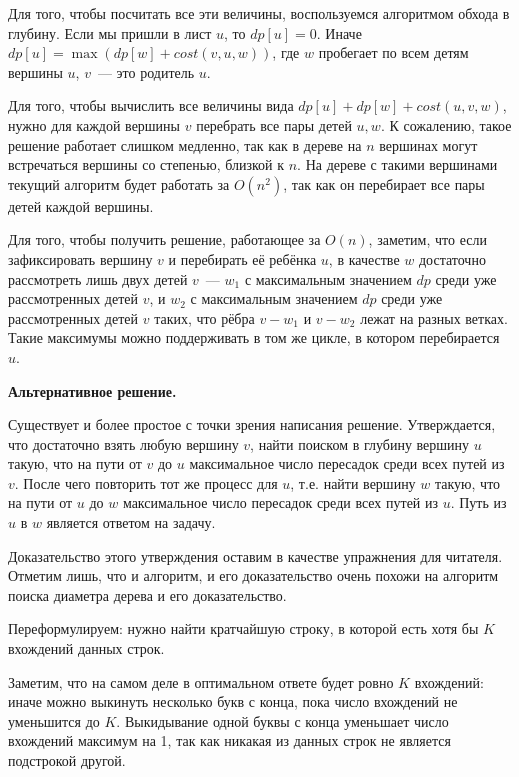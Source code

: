 \documentclass[12pt]{article}
\theoremstyle{definition}
\begin{document}
Для того, чтобы посчитать все эти величины, воспользуемся алгоритмом обхода в глубину. Если мы пришли в лист $u$, то $dp[u]=0$. Иначе $dp[u]=\max(dp[w]+cost(v,u,w))$, где $w$ пробегает по всем детям вершины $u$, $v$~--- это родитель $u$.

Для того, чтобы вычислить все величины вида $dp[u]+dp[w]+cost(u,v,w)$, нужно для каждой вершины $v$ перебрать все пары детей $u,w$. К сожалению, такое решение работает слишком медленно, так как в дереве на $n$ вершинах могут встречаться вершины со степенью, близкой к $n$. На дереве с такими вершинами текущий алгоритм будет работать за $O(n^2)$, так как он перебирает все пары детей каждой вершины.

Для того, чтобы получить решение, работающее за $O(n)$, заметим, что если зафиксировать вершину $v$ и перебирать её ребёнка $u$, в качестве $w$ достаточно рассмотреть лишь двух детей $v$~--- $w_1$ с максимальным значением $dp$ среди уже рассмотренных детей $v$, и $w_2$ с максимальным значением $dp$ среди  уже рассмотренных детей $v$ таких, что рёбра $v-w_1$ и $v-w_2$ лежат на разных ветках. Такие максимумы можно поддерживать в том же цикле, в котором перебирается $u$.

\textbf{Альтернативное решение.}

Существует и более простое с точки зрения написания решение. Утверждается, что достаточно взять любую вершину $v$, найти поиском в глубину вершину $u$ такую, что на пути от $v$ до $u$ максимальное число пересадок среди всех путей из $v$. После чего повторить тот же процесс для $u$, т.е. найти вершину $w$ такую, что на пути от $u$ до $w$ максимальное число пересадок среди всех путей из $u$. Путь из $u$ в $w$ является ответом на задачу.

Доказательство этого утверждения оставим в качестве упражнения для читателя. Отметим лишь, что и алгоритм, и его доказательство очень похожи на алгоритм поиска диаметра дерева и его доказательство.

\pagebreak

Переформулируем: нужно найти кратчайшую строку, в которой есть хотя бы $K$ вхождений данных строк.

Заметим, что на самом деле в оптимальном ответе будет ровно $K$ вхождений: иначе можно выкинуть несколько букв с конца, пока число вхождений не уменьшится до $K$. Выкидывание одной буквы с конца уменьшает число вхождений максимум на 1, так как никакая из данных строк не является подстрокой другой.
\end{document}
